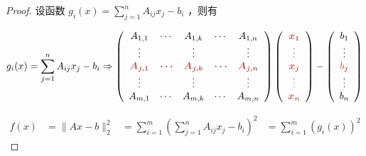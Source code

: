 \begin{proof}
    设函数 $ g_{i}(x)=\sum_{j=1}^{n} A_{i j} x_{j}-b_{i} $ ，则有

    
        $$g_{i}( x) =\sum\limits _{j=1}^{n} A_{ij} x_{j} -b_{i} \Rightarrow \left(\begin{array}{ c c c c c }
        A_{1,1} & \cdots  & A_{1,k} & \cdots  & A_{1,n}\\
        \vdots  &  & \vdots  &  & \vdots \\
        \boldsymbol{\textcolor[rgb]{0.72,0.33,0.31}{A}\textcolor[rgb]{0.72,0.33,0.31}{_{j,1}}} & \boldsymbol{\textcolor[rgb]{0.72,0.33,0.31}{\cdots }} & \boldsymbol{\textcolor[rgb]{0.72,0.33,0.31}{A}\textcolor[rgb]{0.72,0.33,0.31}{_{j,k}}} & \boldsymbol{\textcolor[rgb]{0.72,0.33,0.31}{\cdots }} & \boldsymbol{\textcolor[rgb]{0.72,0.33,0.31}{A}\textcolor[rgb]{0.72,0.33,0.31}{_{j,n}}}\\
        \vdots  &  & \vdots  &  & \vdots \\
        A_{m,1} & \cdots  & A_{m,k} & \cdots  & A_{m,n}
        \end{array}\right)\left(\begin{array}{ c }
        \boldsymbol{\textcolor[rgb]{0.72,0.33,0.31}{x}\textcolor[rgb]{0.72,0.33,0.31}{_{1}}}\\
        \boldsymbol{\textcolor[rgb]{0.72,0.33,0.31}{\vdots }}\\
        \boldsymbol{\textcolor[rgb]{0.72,0.33,0.31}{x}\textcolor[rgb]{0.72,0.33,0.31}{_{j}}}\\
        \boldsymbol{\textcolor[rgb]{0.72,0.33,0.31}{\vdots }}\\
        \boldsymbol{\textcolor[rgb]{0.72,0.33,0.31}{x}\textcolor[rgb]{0.72,0.33,0.31}{_{n}}}
        \end{array}\right) -\left(\begin{array}{ c }
        \textcolor[rgb]{0,0,0}{b_{1}}\\
        \textcolor[rgb]{0,0,0}{\vdots }\\
        \textcolor[rgb]{0.72,0.33,0.31}{b\boldsymbol{_{j}}}\\
        \textcolor[rgb]{0,0,0}{\vdots }\\
        \textcolor[rgb]{0,0,0}{b_{n}}
        \end{array}\right)$$
    
    $$\begin{aligned} 
        f(x)&=\|A x-b\|_{2}^{2}
        &=\sum_{i=1}^{m}\left(\sum_{j=1}^{n} A_{i j} x_{j}-b_{i}\right)^{2}
        &=\sum_{i=1}^{m}\left(g_{i}(x)\right)^{2} 
    \end{aligned}$$


\end{proof}
